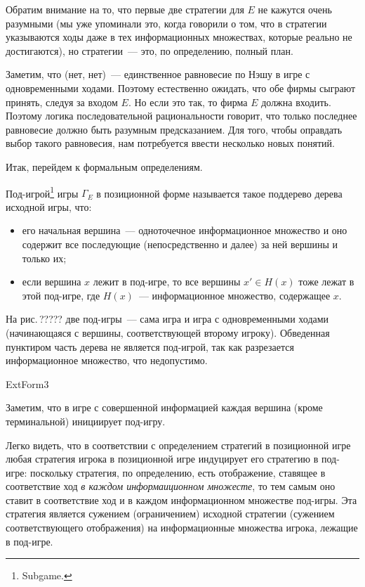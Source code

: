 \documentclass[12pt]{book}
\begin{document}
Обратим внимание на то, что первые две стратегии для $E$ не кажутся
очень разумными (мы уже упоминали это, когда говорили о том, что
в стратегии указываются ходы даже в тех информационных множествах,
которые реально не достигаются), но стратегии~--- это, по определению,
полный план.

Заметим, что (нет, нет)~--- единственное равновесие по Нэшу в игре с
одновременными ходами. Поэтому естественно ожидать, что обе фирмы
сыграют принять, следуя за входом $E$. Но если это так, то
фирма  $E$ должна входить. Поэтому логика последовательной рациональности
говорит, что только последнее равновесие должно быть разумным
предсказанием. Для того, чтобы оправдать выбор такого равновесия,
нам потребуется ввести несколько новых понятий.

Итак, перейдем к формальным определениям.

\begin{definition}
Под-игрой\footnote{ Subgame.} игры $\Gamma_E$ в позиционной форме
называется такое поддерево дерева исходной игры, что:
\begin{itemize}
\item[(1)] его начальная вершина~--- одноточечное информационное
множество и оно содержит все последующие (непосредственно и далее)
за ней вершины и только их;

\item[(2)] если вершина $x$ лежит в под-игре, то все вершины $x'\in
H(x)$ тоже лежат в этой под-игре, где $H(x)$~--- информационное
множество, содержащее $x$.
\end{itemize}
\end{definition}

На рис.\,????? две под-игры~--- сама игра и игра с одновременными
ходами (начинающаяся с вершины, соответствующей второму игроку). Обведенная пунктиром
часть дерева не является под-игрой, так
как разрезается информационное множество, что недопустимо.


ExtForm3



Заметим, что в игре с совершенной информацией каждая вершина (кроме
терминальной) инициирует под-игру.

Легко видеть, что в соответствии с определением стратегий в
позиционной игре любая стратегия игрока в позиционной игре
индуцирует его стратегию в под-игре: поскольку стратегия, по
определению, есть отображение, ставящее в соответствие ход \emph{
в каждом информаиционном множесте}, то тем самым оно ставит
в соответствие ход и в каждом информационном множестве под-игры.
Эта стратегия является сужением
(ограничением) исходной стратегии (сужением соответствующего
отображения) на информационные множества игрока, лежащие в
под-игре.
\end{document}
